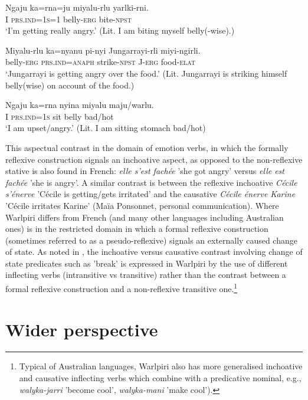 \documentclass[output=paper]{../langscibook}
\begin{document}
\ea%
    \label{ex:laughren:43}
\ea
\label{ex:laughren:43a}
\gll  Ngaju  ka=rna=ju  miyalu-rlu  yarlki-rni.\\
    I  \textsc{prs.ind=1s=1}  belly-\textsc{erg}  bite-\textsc{npst}\\
\glt `I’m getting really angry.’ (Lit. I am biting myself belly(-wise).)

\ex
\label{ex:laughren:43b}
\gll  Miyalu-rlu  ka=nyanu  pi-nyi  Jungarrayi-rli  miyi-ngirli.\\
    belly-\textsc{erg}  \textsc{prs.ind=anaph}  strike-\textsc{npst}  J-\textsc{erg}  food-\textsc{elat}\\
\glt `Jungarrayi is getting angry over the food.'
  (Lit. Jungarrayi is striking himself belly(wise) on account of the food.)

\ex
\label{ex:laughren:43c}
\gll  Ngaju  ka=rna  nyina  miyalu  maju/warlu.\\
    I  \textsc{prs.ind=1s}  sit  belly  bad/hot\\
 \glt `I am upset/angry.' (Lit. I am sitting stomach bad/hot)
 \z
\z


This aspectual contrast in the domain of emotion verbs, in which the formally reflexive construction signals an inchoative aspect, as opposed to the non-reflexive stative is also found in French: \textit{elle s'est fachée} {}'she got angry' versus \textit{elle est fachée} 'she is angry'. A similar contrast is between the reflexive inchoative \textit{Cécile s'énerve} 'Cécile is getting/gets irritated' and the causative \textit{Cécile énerve Karine} 'Cécile irritates Karine' (Maïa Ponsonnet, personal communication). Where Warlpiri differs from French (and many other languages including Australian ones) is in the restricted domain in which a formal reflexive construction (sometimes referred to as a pseudo-reflexive) signals an externally caused change of state. As noted in , the inchoative versus causative contrast involving change of state predicates such as 'break' is expressed in Warlpiri by the use of different inflecting verbs (intransitive vs transitive) rather than the contrast between a formal reflexive construction and a non-reflexive transitive one.\footnote{Typical of Australian languages, Warlpiri also has more generalised inchoative and causative inflecting verbs which combine with a predicative nominal, e.g., \textit{walyka-jarri} 'become cool', \textit{walyka-mani} 'make cool').}

\section{Wider perspective}\label{sec:laughren:7}
\end{document}
